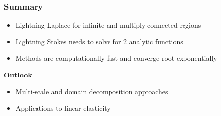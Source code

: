 \begin{frame}
\frametitle{Summary}
\begin{itemize}\itemsep 1em
\item Lightning Laplace for infinite and multiply connected regions
\item Lightning Stokes needs to solve for 2 analytic functions
\item Methods are computationally fast and converge root-exponentially
\end{itemize}

\bigskip
\textbf{Outlook}
\begin{itemize}\itemsep 1em
\item Multi-scale and domain decomposition approaches
\item Applications to linear elasticity
\end{itemize}

\end{frame}
